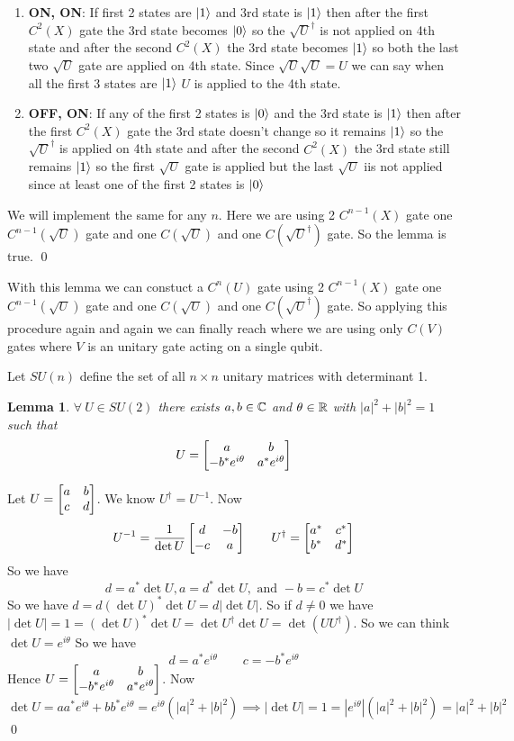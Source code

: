 \documentclass[a4paper, 11pt]{article}
\newtheorem{lemma}{Lemma}
\renewenvironment{proof}{\noindent{\it \textbf{Proof:}}\hspace*{1em}}{\qed\bigskip\\}
\begin{document}
{\begin{proof}
\begin{enumerate}
		\item \textbf{ON, ON}: If first 2 states are $\ket{1}$ and 3rd state is $\ket{1}$ then after the first $C^2(X)$ gate the 3rd state becomes $\ket{0}$ so the $\sqrt{U}^{\dagger}$ is not applied  on 4th state and after the second $C^2(X)$ the 3rd state becomes $\ket{1}$ so both  the last two $\sqrt{U}$ gate are applied on 4th state. Since $\sqrt{U}\sqrt{U}=U$ we can say when all the first 3 states are $\ket{1}$ $U$ is applied to the 4th state.
		\item \textbf{OFF, ON}: If any of the first 2 states is $\ket{0}$ and the 3rd state is $\ket{1}$ then after the first $C^2(X)$ gate the 3rd state doesn't change so it remains $\ket{1}$ so the $\sqrt{U}^{\dagger}$ is  applied  on 4th state and after the second $C^2(X)$ the 3rd state still remains  $\ket{1}$ so the first $\sqrt{U}$ gate is applied but the last $\sqrt{U}$ iis not applied since at least one of the first 2 states is $\ket{0}$
	\end{enumerate}
	We will implement the same for any $n$. Here we are using 2 $C^{n-1}(X)$ gate one $C^{n-1}(\sqrt{U})$ gate and one $C(\sqrt{U})$ and one $C(\sqrt{U}^{\dagger})$ gate. So the lemma is true.
	\end{proof}
	
	With this lemma we can constuct a $C^n(U)$ gate using 2 $C^{n-1}(X)$ gate one $C^{n-1}(\sqrt{U})$ gate and one $C(\sqrt{U})$ and one $C(\sqrt{U}^{\dagger})$ gate. So applying this procedure again and again we can finally reach where we are using only $C(V)$ gates where $V$ is an unitary gate acting on a single qubit.
	
	Let $SU(n)$ define the set of all $n\times n$ unitary matrices with determinant 1. 
	\begin{lemma}
		$\forall\ U\in SU(2)$ there exists $a,b\in\mathbb{C}$ and $\theta \in \mathbb{R}$ with $|a|^2+|b|^2=1$  such that $$U=\left[\begin{matrix}a & b\\ -b^*e^{i\theta} & a^*e^{i\theta}\end{matrix}\right]$$
	\end{lemma}
	\begin{proof}
		Let $U=\left[\begin{matrix}a & b\\ c & d\end{matrix}\right]$. We know $U^{\dagger}=U^{-1}$. Now $$U^{-1}=\frac1{\det U}\left[\begin{matrix}d & -b\\ -c & a\end{matrix}\right] \qquad U^{\dagger}=\left[\begin{matrix}a^* & c^*\\ b^* & d^*\end{matrix}\right]$$So we have $$d=a^*\det U, a=d^*\det U, \text{ and } -b=c^*\det U$$So we have $d=d(\det U)^*\det U=d|\det U|$. So if $d\neq 0$ we have $|\det U|=1=(\det{U})^*\det U=\det U^{\dagger}\det U=\det (UU^{\dagger})$. So we can think $\det U=e^{i\theta}$ So we have $$d=a^* e^{i\theta}\qquad c=-b^*e^{i\theta}$$Hence $U=\left[\begin{matrix}a & b\\ -b^*e^{i\theta} & a^*e^{i\theta}\end{matrix}\right]$. Now $$\det U=aa^*e^{i\theta} +bb^*e^{i\theta}=e^{i\theta}(|a|^2+|b|^2)\implies |\det U|=1=|e^{i\theta}| (|a|^2+|b|^2)=|a|^2+|b|^2$$
	\end{proof}
	
}
\end{document}
